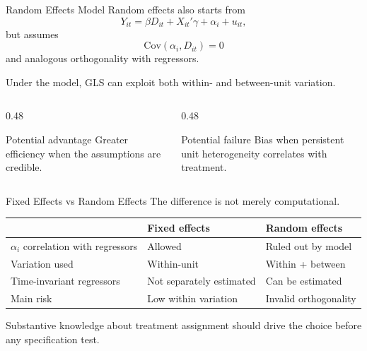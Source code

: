 \documentclass[aspectratio=169,11pt]{beamer}
\newcommand{\Cov}{\mathrm{Cov}}
\begin{document}
\begin{frame}{Random Effects Model}
Random effects also starts from
\[
Y_{it}=\beta D_{it}+X_{it}'\gamma+\alpha_i+u_{it},
\]
but assumes
\[
\Cov(\alpha_i,D_{it})=0
\]
and analogous orthogonality with regressors.

Under the model, GLS can exploit both within- and between-unit variation.

\begin{columns}[T]
\begin{column}{0.48\textwidth}
\begin{block}{Potential advantage}
Greater efficiency when the assumptions are credible.
\end{block}
\end{column}
\begin{column}{0.48\textwidth}
\begin{alertblock}{Potential failure}
Bias when persistent unit heterogeneity correlates with treatment.
\end{alertblock}
\end{column}
\end{columns}
\end{frame}

\begin{frame}{Fixed Effects vs Random Effects}
The difference is not merely computational.

\begin{tabular}{p{3.2cm}p{4.3cm}p{4.3cm}}
\toprule
& \textbf{Fixed effects} & \textbf{Random effects} \\
\midrule
\(\alpha_i\) correlation with regressors & Allowed & Ruled out by model \\
Variation used & Within-unit & Within + between \\
Time-invariant regressors & Not separately estimated & Can be estimated \\
Main risk & Low within variation & Invalid orthogonality \\
\bottomrule
\end{tabular}

\vspace{0.4cm}
Substantive knowledge about treatment assignment should drive the choice before any specification test.
\end{frame}
\end{document}
